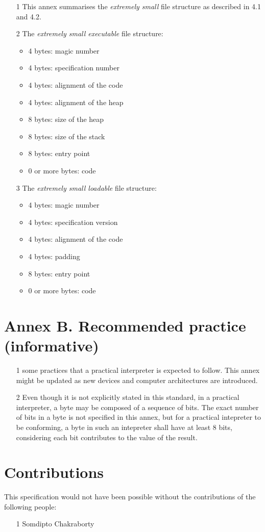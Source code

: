 \documentclass[a4paper]{article}
\begin{document}
    \begin{enumerate}
        \item[1 ] This annex summarises the \emph {extremely small} file structure as described in 4.1 and 4.2. 
        \item[2 ] The \emph{extremely small executable} file structure:
            \begin{itemize}
                \item 4 bytes: magic number
                \item 4 bytes: specification number
                \item 4 bytes: alignment of the code
                \item 4 bytes: alignment of the heap
                \item 8 bytes: size of the heap
                \item 8 bytes: size of the stack
                \item 8 bytes: entry point
                \item 0 or more bytes: code
            \end{itemize}
        \item[3 ] The \emph{extremely small loadable} file structure:
            \begin{itemize}
                \item 4 bytes: magic number
                \item 4 bytes: specification version
                \item 4 bytes: alignment of the code
                \item 4 bytes: padding
                \item 8 bytes: entry point
                \item 0 or more bytes: code
            \end{itemize}
    \end{enumerate}

    \section{Annex B. Recommended practice (informative)}

    \begin{enumerate}
        \item[1 ] some practices that a practical interpreter is expected to follow. This annex might be updated as new devices and computer architectures are introduced.
        \item[2 ] Even though it is not explicitly stated in this standard, in a practical interpreter, a byte may be composed of a sequence of bits. The exact number of bits in a byte is not specified in this annex, but for a practical intepreter to be conforming, a byte in such an intepreter shall have at least 8 bits, considering each bit contributes to the value of the result.
    \end{enumerate}

    \section{Contributions}

    This specification would not have been possible without the contributions of the following people:

    \begin{enumerate}
        \item[1 ] Somdipto Chakraborty
    \end{enumerate}
\end{document}
